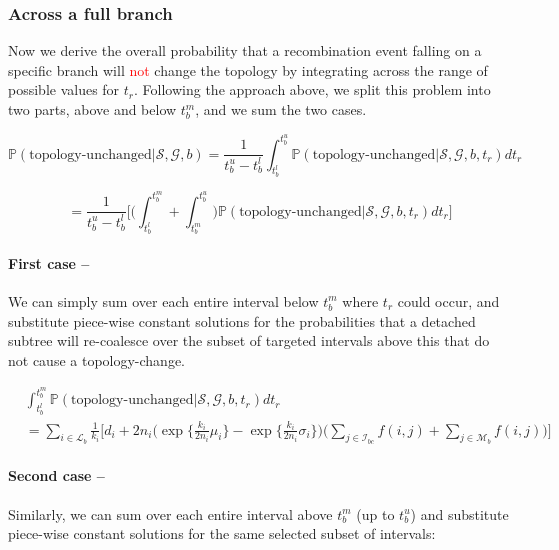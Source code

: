 \documentclass[11pt]{article}
\begin{document}
\subsubsection{Across a full branch}

Now we derive the overall probability that a recombination event falling on a specific branch will 
\textcolor{red}{not} change the topology by integrating across the range of possible values for $t_r$.
Following the approach above, we split this problem into two parts, above and below
$t_b^m$, and we sum the two cases.

\begin{equation}
	\mathbb{P}(\text{topology-unchanged} | \mathcal{S}, \mathcal{G}, b) = 
	\frac{1}{t_b^u - t_b^l} \int_{t_b^l}^{t_b^u}
	\mathbb{P}(\text{topology-unchanged} | \mathcal{S}, \mathcal{G},b, t_r) dt_r
\end{equation}

\begin{equation}
	= \frac{1}{t_b^u - t_b^l}
	\bigg[
		\bigg(
			\int_{t_b^l}^{t_b^m} + 
			\int_{t_b^m}^{t_b^u}
		\bigg)
		\mathbb{P}(\text{topology-unchanged} | \mathcal{S}, \mathcal{G},b, t_r) dt_r
	\bigg]
\end{equation}


\paragraph{First case --}
We can simply sum over each entire interval below $t_b^m$ where $t_r$ could occur, and 
substitute piece-wise constant solutions for the probabilities that a detached
subtree will re-coalesce over the subset of targeted intervals above this that
do not cause a topology-change.

\begin{equation}
\begin{aligned}
	&\int_{t_b^l}^{t_b^m} {\mathbb{P}(\text{topology-unchanged} | \mathcal{S}, \mathcal{G}, b, t_r)} dt_r \\
	&= \sum_{i \in \mathcal{L}_b} \frac{1}{k_i} \Bigg[ 
		d_i + 2n_i \bigg( 
			\exp \bigg\{\frac{k_i}{2n_i} \mu_i \bigg\} - 
			\exp \bigg\{\frac{k_i}{2n_i} \sigma_i\bigg\} 
		\bigg)
		\bigg(
			\sum_{j \in \mathcal{I}_{bc}} f(i,j) + \sum_{j \in \mathcal{M}_b} f(i,j) 
		\bigg) 
	\Bigg]
\end{aligned}
\end{equation}

\paragraph{Second case --}
Similarly, we can sum over each entire interval above $t_b^m$ (up to $t_b^u$) and substitute piece-wise
constant solutions for the same selected subset of intervals:
\end{document}
